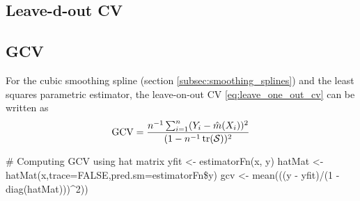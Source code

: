 \subsection{Leave-d-out CV}

\subsection{GCV}
\begin{theory}
 For the cubic smoothing spline (section \ref{subsec:smoothing_splines}) and the least squares parametric estimator,
 the leave-on-out CV \eqref{eq:leave_one_out_cv} can be written as
\begin{equation*}
 \text{GCV} = \frac{n^{-1}\sum_{i=1}^n(Y_i - \hat{m}(X_i))^2}{(1-n^{-1} \operatorname{tr}(\mathcal{S}))^2}
\end{equation*}
\end{theory}

\begin{code}
 # Computing GCV using hat matrix
 yfit <- estimatorFn(x, y)
 hatMat <- hatMat(x,trace=FALSE,pred.sm=estimatorFn\$y) %
 gcv <- mean(((y - yfit)/(1 - diag(hatMat)))^2))
\end{code}
